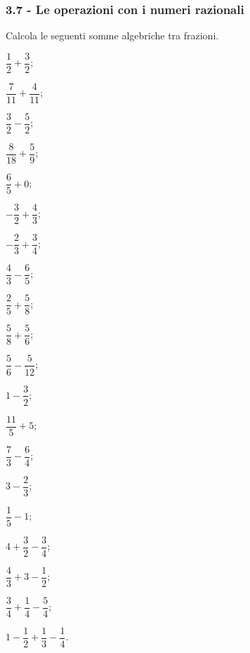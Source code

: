 
\subsubsection*{3.7 - Le operazioni con i numeri razionali}


\begin{esercizio}[\Ast]
 \label{ese:3.46}
Calcola le seguenti somme algebriche tra frazioni.
\begin{multicols}{4}
\begin{enumeratea}
\spazielenx
\item $\dfrac{1}{2} + \dfrac{3}{2}$;
\item $\dfrac{7}{11} + \dfrac{4}{11}$;
\item $\dfrac{3}{2} - \dfrac{5}{2}$;
\item $\dfrac{8}{18} + \dfrac{5}{9}$;
\item $\dfrac{6}{5} + 0$;
\item $-\dfrac{3}{2}+\dfrac{4}{3}$;
\item $-\dfrac{2}{3}+\dfrac{3}{4}$;
\item $\dfrac{4}{3}-\dfrac{6}{5}$;
\item $\dfrac{2}{5}+\dfrac{5}{8}$;
\item $\dfrac{5}{8}+\dfrac{5}{6}$;
\item $\dfrac{5}{6}-\dfrac{5}{12}$;
\item $1-\dfrac{3}{2}$;
\item $\dfrac{11}{5}+5$;
\item $\dfrac{7}{3}-\dfrac{6}{4}$;
\item $3-\dfrac{2}{3}$;
\item $\dfrac{1}{5}-1$;
\item $4+\dfrac{3}{2}-\dfrac{3}{4}$;
\item $\dfrac{4}{3}+3-\dfrac{1}{2}$;
\item $\dfrac{3}{4}+\dfrac{1}{4}-\dfrac{5}{4}$;
\item $1-\dfrac{1}{2}+\dfrac{1}{3}-\dfrac{1}{4}$.
\end{enumeratea}
\end{multicols}
\end{esercizio}

